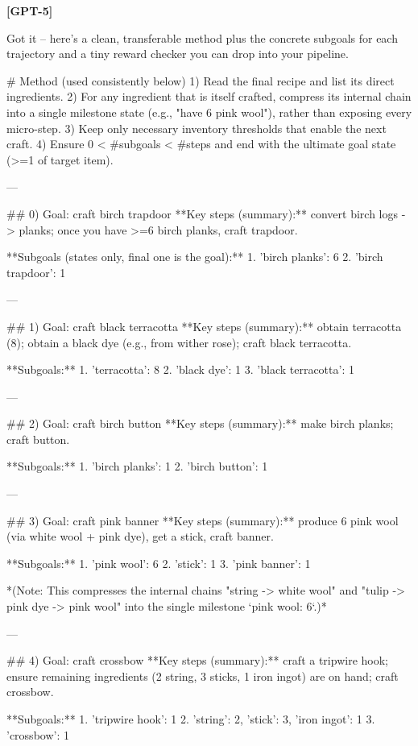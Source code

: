 \textbf{[GPT-5]}
\begin{ModelTurn}
Got it -- here's a clean, transferable method plus the concrete subgoals for each trajectory and a tiny reward checker you can drop into your pipeline.

# Method (used consistently below)
1) Read the final recipe and list its direct ingredients.  
2) For any ingredient that is itself crafted, compress its internal chain into a single milestone state (e.g., "have 6 pink wool"), rather than exposing every micro-step.  
3) Keep only necessary inventory thresholds that enable the next craft.  
4) Ensure 0 < #subgoals < #steps and end with the ultimate goal state (>=1 of target item).

---

## 0) Goal: craft birch trapdoor
**Key steps (summary):** convert birch logs -> planks; once you have >=6 birch planks, craft trapdoor.

**Subgoals (states only, final one is the goal):**
1. {'birch planks': 6}  
2. {'birch trapdoor': 1}

---

## 1) Goal: craft black terracotta
**Key steps (summary):** obtain terracotta (8); obtain a black dye (e.g., from wither rose); craft black terracotta.

**Subgoals:**
1. {'terracotta': 8}  
2. {'black dye': 1}  
3. {'black terracotta': 1}

---

## 2) Goal: craft birch button
**Key steps (summary):** make birch planks; craft button.

**Subgoals:**
1. {'birch planks': 1}  
2. {'birch button': 1}

---

## 3) Goal: craft pink banner
**Key steps (summary):** produce 6 pink wool (via white wool + pink dye), get a stick, craft banner.

**Subgoals:**
1. {'pink wool': 6}  
2. {'stick': 1}  
3. {'pink banner': 1}

*(Note: This compresses the internal chains "string -> white wool" and "tulip -> pink dye -> pink wool" into the single milestone `pink wool: 6`.)*

---

## 4) Goal: craft crossbow
**Key steps (summary):** craft a tripwire hook; ensure remaining ingredients (2 string, 3 sticks, 1 iron ingot) are on hand; craft crossbow.

**Subgoals:**
1. {'tripwire hook': 1}  
2. {'string': 2, 'stick': 3, 'iron ingot': 1}  
3. {'crossbow': 1}


\end{ModelTurn}
